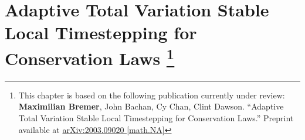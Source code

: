 


\chapter[Adaptive Total Variation Stable Local Timestepping for Conservation Laws]{Adaptive Total Variation Stable Local Timestepping for Conservation Laws%
\footnote{%
This chapter is based on the following publication currently under review: {\bf Maximilian Bremer}, John Bachan, Cy Chan, Clint Dawson. ``Adaptive Total Variation Stable Local Timestepping for Conservation Laws.'' Preprint available at \href{https://arxiv.org/abs/2003.09020}{arXiv:2003.09020 [math.NA]}}}
\label{ch:lts}








